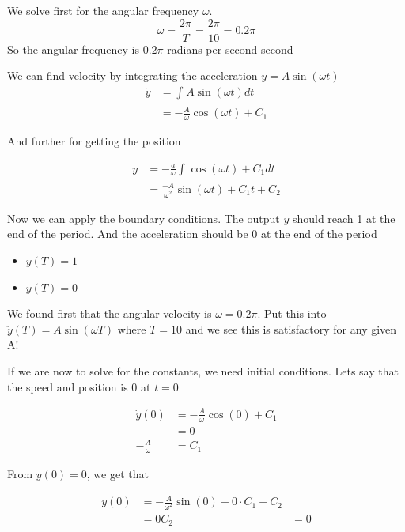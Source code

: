 \documentclass[12pt,a4paper, onecolumn]{exam}
\begin{document}
\begin{questions}
\begin{parts}
  \begin{solution}
  We solve first for the angular frequency $ \omega $. 
  \[
      \omega = \frac{ 2\pi }{ T } = \frac{ 2\pi }{ 10 } = 0.2\pi
  \]
  So the angular frequency is $ 0.2 \pi $ radians per second
  second

  We can find velocity by integrating the acceleration $ \ddot{y} = A \sin \left( \omega t \right)  $ 
  \begin{align*}
    \dot{y} &= \int_{}^{} A \sin \left( \omega t \right) dt   \\
    &= - \frac{ A }{ \omega } \cos \left( \omega t \right) + C_1
  \end{align*}

  And further for getting the position

  \begin{align*}
    y &= - \frac{ a }{ \omega } \int_{}^{}  \cos \left( \omega t \right) + C_1 dt \\
    &= \frac{ -A }{ \omega^2 } \sin \left( \omega t \right) + C_1t + C_2 
  \end{align*}
  
  Now we can apply the boundary conditions. The output $ y $ should reach 1 at the end of the period. And the acceleration should be 0 at the end of the period

  \begin{itemize}
    \item $ y(T) = 1 $
    \item $ \ddot{y}(T)= 0 $  
  \end{itemize}

  We found first that the angular velocity is $ \omega = 0.2 \pi $. Put this into $ \ddot{y}(T) = A \sin \left( \omega T \right)  $   where $ T=10 $ and we see this is satisfactory for any given A!

  If we are now to solve for the constants, we need initial conditions. Lets say that the speed and position is 0 at $ t=0 $ 

  \begin{align*}
    \dot{y}(0) &= - \frac{ A }{ \omega } \cos(0) + C_1\\
    &= 0\\
    - \frac{ A }{ \omega } &= C_1
  \end{align*}

  From $ y(0) = 0 $, we get that
  
  \begin{align*}
    y(0) &= - \frac{ A }{ {\omega^2} } \sin (0) + 0 \cdot C_1 + C_2 \\
    &= 0
    C_2 &= 0
  \end{align*}
  

\end{solution}
\end{parts}
\end{questions}
\end{document}
